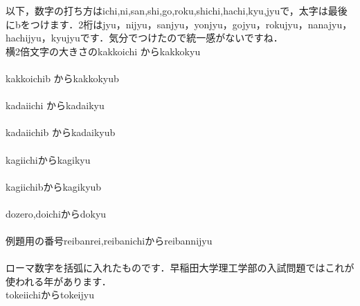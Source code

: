 \documentclass [10pt,fleqn,b5paper]{jsarticlek}
\begin{document}
以下，数字の打ち方はichi,ni,san,shi,go,roku,shichi,hachi,kyu,jyuで，太字は最後にbをつけます．2桁はjyu，nijyu，sanjyu，yonjyu，gojyu，rokujyu，nanajyu，hachijyu，kyujyuです．気分でつけたので統一感がないですね．\\
横2倍文字の大きさの\yy kakkoichi から\yy kakkokyu\\
\kakkoichi
\kakkoni
\kakkosan
\kakkoshi
\kakkogo
\kakkoroku
\kakkoshichi
\kakkohachi
\kakkokyu\\
\yy kakkoichib から\yy kakkokyub\\
\kakkoichib
\kakkonib
\kakkosanb
\kakkoshib
\kakkogob
\kakkorokub
\kakkoshichib
\kakkohachib
\kakkokyub\\
\yy kadaiichi から\yy kadaikyu\\
\kadaiichi
\kadaini
\kadaisan
\kadaishi
\kadaigo
\kadairoku
\kadaishichi
\kadaihachi
\kadaikyu\\
\yy kadaiichib から\yy kadaikyub\\
\kadaiichib
\kadainib
\kadaisanb
\kadaishib
\kadaigob
\kadairokub
\kadaishichib
\kadaihachib
\kadaikyub\\
kagiichiからkagikyu\\
\kagiichi
\kagini
\kagisan
\kagishi
\kagigo
\kagiroku
\kagishichi
\kagihachi
\kagikyu\\
kagiichibからkagikyub\\
\kagiichib
\kaginib
\kagisanb
\kagishib
\kagigob
\kagirokub
\kagishichib
\kagihachib
\kagikyub\\
dozero,doichiからdokyu\\
\dozero
\doichi
\doni
\dosan
\doshi
\dogo
\doroku
\doshichi
\dohachi
\dokyu\\
例題用の番号reibanrei,reibanichiからreibannijyu\\
\reibanrei
\reibanichi
\reibanni
\reibansan
\reibanshi
\reibango
\reibanroku
\reibanshichi
\reibanhachi
\reibankyu
\reibanjyu
\reibanjyuichi
\reibanjyuni
\reibanjyusan
\reibanjyushi
\reibanjyugo
\reibanjyuroku
\reibanjyushichi
\reibanjyuhachi
\reibanjyukyu
\reibannijyu\\
ローマ数字を括弧に入れたものです．早稲田大学理工学部の入試問題ではこれが使われる年があります．\\
\yy tokeiichiから\yy tokeijyu\\
\tokeiichi
\tokeini
\tokeisan
\tokeishi
\tokeigo
\tokeiroku
\tokeishichi
\tokeihachi
\tokeikyu
\tokeijyu\\
\end{document}
